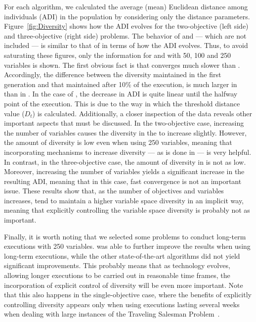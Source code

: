 For each algorithm, we calculated the average (mean) Euclidean distance among individuals (ADI) in the population by considering only 
the distance parameters.
%
Figure~\ref{fig:Diversity} shows how the ADI evolves for the two-objective (left side) and three-objective (right side) problems.
%
The behavior of \NSGAII{} and \MOEAD{} --- which are not included --- is similar to that of \RMOEA{} in terms of how the ADI evolves. 
%
Thus, to avoid saturating these figures, only the information for \VSDMOEA{} and \RMOEA{} with 50, 100 and 250 variables is shown.
%
The first obvious fact is that \VSDMOEA{} converges much slower than \RMOEA{}.
%
Accordingly, the difference between the diversity maintained in the first generation and that maintained after 10\% of the execution,
is much larger in \RMOEA{} than in \VSDMOEA{}.
%
In the case of \VSDMOEA{}, the decrease in ADI is quite linear until the halfway point of the execution.
%
This is due to the way in which the threshold distance value ($D_t$) is calculated.
%
Additionally, a closer inspection of the data reveals other important aspects that must be discussed. 
%
In the two-objective case, increasing the number of variables causes the diversity in the \RMOEA{} to increase slightly.
%
However, the amount of diversity is low even when using 250 variables, meaning that incorporating mechanisms to increase diversity --- as is done in \VSDMOEA{} ---
is very helpful.
%
In contrast, in the three-objective case, the amount of diversity in \RMOEA{} is not as low.
%
Moreover, increasing the number of variables yields a significant increase in the resulting ADI, meaning that in this case,
fast convergence is not an important issue.
%
These results show that, as the number of objectives and variables increases, \MOEAS{} tend to maintain a higher variable space diversity
in an implicit way, meaning that explicitly controlling the variable space diversity is probably not as important.
%

Finally, it is worth noting that we selected some problems to conduct long-term executions with 250 variables.
%
\VSDMOEA{} was able to further improve the results when using long-term executions, while the other state-of-the-art algorithms did not yield significant improvements.
%
This probably means that as technology evolves, allowing longer executions to be carried out in reasonable time frames,
the incorporation of explicit control of diversity will be even more important.
%
Note that this also happens in the single-objective case, where the benefits of explicitly controlling diversity appears only when using executions lasting
several weeks when dealing with large instances of the Traveling Salesman Problem~\citep{segura2015novel}.
%

